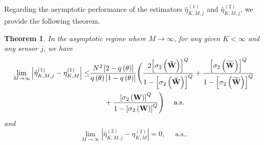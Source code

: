 \documentclass[11pt, draftclsnofoot, onecolumn]{IEEEtran}
\newtheorem{theorem}{Theorem}
\newcommand{\cW}{{\check{W}}}
\newcommand{\tW}{{\widetilde{W}}}
\begin{document}
Regarding the asymptotic performance of the estimators $\hat \eta _{K,M,j}^{(1)}$ and $\hat \eta _{K,M,j}^{(2)}$, we provide the following theorem.
\begin{theorem} \label{Theorem_estimate_eta_1_and_2}
	In the asymptotic regime where $M \to \infty$, for any given $K<\infty$ and any sensor $j$, we have
	\begin{align} \notag
	\mathop {\lim }\limits_{M \to \infty } \left| {\hat \eta _{K,M,j}^{(1)} - \eta _{K,M}^{(1)}} \right| \le  & \frac{ {N^2} \left[{2 - q\left( \theta  \right)} \right] }{{q\left( \theta  \right)\left[ {1 - q\left( \theta  \right)} \right]}} \Bigg(  \frac{{2{{\left[ {{\sigma _2}\left( {\bf{\cW}} \right)} \right]}^Q}}}{{1 - {{\left[ {{\sigma _2}\left( {\bf{\cW}} \right)} \right]}^Q}}}  + \frac{{{{\left[ {{\sigma _2}\left( {\bf{\tW}} \right)} \right]}^Q}}}{{1 - {{\left[ {{\sigma _2}\left( {\bf{\tW}} \right)} \right]}^Q}}} \\  \label{theorem_eta_diff_1}
	&  \qquad  + \frac{{{{\left[ {{\sigma _2}\left( {\bf{W}} \right)} \right]}^Q}}}{{1 - {{\left[ {{\sigma _2}\left( {\bf{W}} \right)} \right]}^Q}}}\Bigg) \quad \text{ a.s.} 
	\end{align}
	and
	\begin{equation} \label{theorem_eta_diff_2}
	\mathop {\lim }\limits_{M \to \infty } \left| {\hat \eta _{K,M,j}^{(2)} - \eta _{K,M}^{(2)}} \right| = 0,	\quad \text{ a.s.}.
	\end{equation}
\end{theorem}
\end{document}

